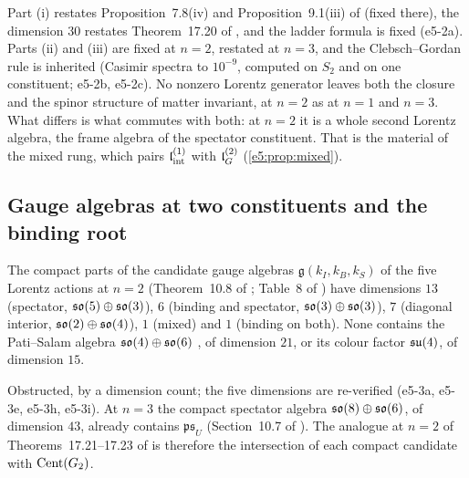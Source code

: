 Part (i) restates Proposition~7.8(iv) and Proposition~9.1(iii) of \cite{RE} (fixed there), the dimension $30$ restates Theorem~17.20 of
\cite{ES17}, and the ladder formula is fixed (e5-2a). Parts (ii) and (iii) are fixed at $n=2$, restated at $n=3$, and the Clebsch--Gordan rule is
inherited (Casimir spectra to $10^{-9}$, computed on $S_2$ and on one constituent; e5-2b, e5-2c). No nonzero Lorentz generator leaves both the
closure and the spinor structure of matter invariant, at $n=2$ as at $n=1$ and $n=3$. What differs is what commutes with both: at $n=2$ it is a
whole second Lorentz algebra, the frame algebra of the spectator constituent. That is the material of the mixed rung, which pairs $\mathfrak l_{\rm int}^{(1)}$ with
$\mathfrak l_G^{(2)}$ (\cref{e5:prop:mixed}).

\subsection{Gauge algebras at two constituents and the binding root}
\label{e5:sec:gauge}

\begin{proposition}
\label{e5:prop:noPS}
The compact parts of the candidate gauge algebras $\mathfrak g(k_I,k_B,k_S)$ of the five Lorentz actions at $n=2$ (Theorem~10.8 of \cite{ES17};
Table~8 of \cite{RE}) have dimensions $13$ (spectator, $\mathfrak{so}(5)\oplus\mathfrak{so}(3)$), $6$ (binding and spectator, $\mathfrak{so}(3)\oplus\mathfrak{so}(3)$), $7$ (diagonal interior,
$\mathfrak{so}(2)\oplus\mathfrak{so}(4)$), $1$ (mixed) and $1$ (binding on both). None contains the Pati--Salam algebra $\mathfrak{so}(4)\oplus\mathfrak{so}(6)$ \cite{PatiSalam}, of dimension $21$,
or its colour factor $\mathfrak{su}(4)$, of dimension $15$.
\end{proposition}

Obstructed, by a dimension count; the five dimensions are re-verified (e5-3a, e5-3e, e5-3h, e5-3i). At $n=3$ the compact spectator algebra
$\mathfrak{so}(8)\oplus\mathfrak{so}(6)$, of dimension $43$, already contains $\mathfrak{ps}_U$ (Section~10.7 of \cite{ES17}). The analogue at $n=2$ of
Theorems~17.21--17.23 of \cite{ES17} is therefore the intersection of each compact candidate with $\operatorname{Cent}(G_2)$.

